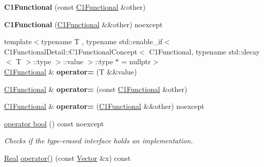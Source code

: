 \begin{DoxyCompactItemize}
\item 
{\bfseries C1\+Functional} (const \hyperlink{classSpacy_1_1C1Functional}{C1\+Functional} \&other)\hypertarget{classSpacy_1_1C1Functional_a8d21587d3af612977b1d054a1997d813}{}\label{classSpacy_1_1C1Functional_a8d21587d3af612977b1d054a1997d813}

\item 
{\bfseries C1\+Functional} (\hyperlink{classSpacy_1_1C1Functional}{C1\+Functional} \&\&other) noexcept\hypertarget{classSpacy_1_1C1Functional_a575dc479928f798cae8ad12285ec7563}{}\label{classSpacy_1_1C1Functional_a575dc479928f798cae8ad12285ec7563}

\item 
{\footnotesize template$<$typename T , typename std\+::enable\+\_\+if$<$ C1\+Functional\+Detail\+::\+C1\+Functional\+Concept$<$ C1\+Functional, typename std\+::decay$<$ T $>$\+::type $>$\+::value $>$\+::type $\ast$  = nullptr$>$ }\\\hyperlink{classSpacy_1_1C1Functional}{C1\+Functional} \& {\bfseries operator=} (T \&\&value)\hypertarget{classSpacy_1_1C1Functional_a1a6c4893ea11ebeff6647fc12f8b979d}{}\label{classSpacy_1_1C1Functional_a1a6c4893ea11ebeff6647fc12f8b979d}

\item 
\hyperlink{classSpacy_1_1C1Functional}{C1\+Functional} \& {\bfseries operator=} (const \hyperlink{classSpacy_1_1C1Functional}{C1\+Functional} \&other)\hypertarget{classSpacy_1_1C1Functional_a31c2416c61d514298b7ac06526081dae}{}\label{classSpacy_1_1C1Functional_a31c2416c61d514298b7ac06526081dae}

\item 
\hyperlink{classSpacy_1_1C1Functional}{C1\+Functional} \& {\bfseries operator=} (\hyperlink{classSpacy_1_1C1Functional}{C1\+Functional} \&\&other) noexcept\hypertarget{classSpacy_1_1C1Functional_a3777c18d812c550efa28d866e5c196e1}{}\label{classSpacy_1_1C1Functional_a3777c18d812c550efa28d866e5c196e1}

\item 
\hyperlink{classSpacy_1_1C1Functional_a0b5ae1057d50803d71c7e221424e1ed4}{operator bool} () const noexcept
\begin{DoxyCompactList}\small\item\em Checks if the type-\/erased interface holds an implementation. \end{DoxyCompactList}\item 
\hyperlink{classSpacy_1_1Real}{Real} \hyperlink{classSpacy_1_1C1Functional_a621b710f0c8c583d074f4bf4da3cbb09}{operator()} (const \hyperlink{classSpacy_1_1Vector}{Vector} \&x) const \hypertarget{classSpacy_1_1C1Functional_a621b710f0c8c583d074f4bf4da3cbb09}{}\label{classSpacy_1_1C1Functional_a621b710f0c8c583d074f4bf4da3cbb09}


\end{DoxyCompactItemize}
